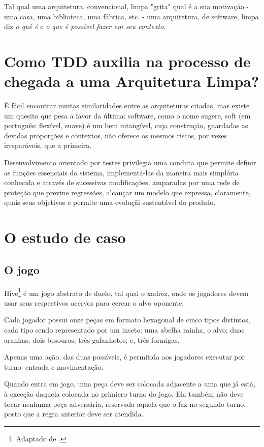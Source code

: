       Tal qual uma arquitetura, convencional, limpa "grita"\cite[p. 196]{ Martin2018} qual é a sua motivação - uma casa, uma biblioteca, uma fábrica, etc. - uma arquitetura, de software,  limpa diz \emph{o quê é} e \emph{o que é possível fazer em seu contexto}.

  \section{Como TDD auxilia na processo de chegada a uma Arquitetura Limpa?}

    É fácil encontrar muitas similaridades entre as arquiteturas citadas, mas existe um quesito que pesa a favor da última: software, como o nome sugere, soft (em português: flexível, suave) é um bem intangível, cuja construção, guardadas as devidas proporções e contextos, não oferece os mesmos riscos, por vezes irreparáveis, que a primeira.

    Desenvolvimento orientado por testes privilegia uma conduta que permite definir as funções essenciais do sistema, implementá-las da maneira mais simplória conhecida e através de sucessivas modificações, amparadas por uma rede de proteção que previne regressões, alcançar um modelo que expressa, claramente, quais seus objetivos e permite uma evoluçãi sustentável do produto.

  \section{O estudo de caso}

    \subsection{O jogo}

      Hive\footnote{Adaptado de \cite{UltraBoardGames2020}.} é um jogo abstrato de duelo, tal qual o xadrez, onde os jogadores devem usar seus respectivos acervos para cercar o alvo oponente.

      Cada jogador possui onze peças em formato hexagonal de cinco tipos distintos, cada tipo sendo representado por um inseto: uma abelha rainha, o alvo; duas aranhas; dois besouros; três gafanhotos; e, três formigas.

      Apenas uma ação, das duas possíveis, é permitida aos jogadores executar por turno: entrada e movimentação.

      Quando entra em jogo, uma peça deve ser colocada adjacente a uma que já está, à exceção daquela colocada no primiero turno do jogo. Ela também não deve tocar nenhuma peça adversária, reservada aquela que o faz no segundo turno, posto que a regra anterior deve ser atendida.


